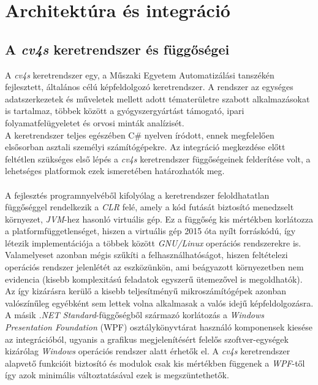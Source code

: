\chapter{Architektúra és integráció} \label{chapter:architektura}

\section{A \emph{cv4s} keretrendszer és függőségei} \label{fuggosegek}


A \emph{cv4s} keretrendszer egy, a Műszaki Egyetem Automatizálási tanszékén fejlesztett, általános célú képfeldolgozó keretrendszer. A rendszer az egységes adatszerkezetek és műveletek mellett adott tématerületre szabott alkalmazásokat is tartalmaz, többek között a gyógyszergyártást támogató, ipari folyamatfelügyeletet és orvosi minták analízisét. \\
A keretrendszer teljes egészében C\# nyelven íródott, ennek megfelelően elsősorban asztali személyi számítógépekre. Az integráció megkezdése előtt feltétlen szükséges első lépés a \emph{cv4s} keretrendszer függőségeinek felderítése volt, a lehetséges platformok ezek ismeretében határozhatók meg. \\
\\
A fejlesztés programnyelvéből kifolyólag a keretrendszer feloldhatatlan függőséggel rendelkezik a \textit{CLR} felé, amely a kód futását biztosító menedzselt környezet, \emph{JVM}-hez hasonló virtuális gép. Ez a függőség kis mértékben korlátozza a platformfüggetlenséget, hiszen a virtuális gép 2015 óta nyílt forráskódú, így létezik implementációja a többek között \emph{GNU/Linux} operációs rendszerekre is. Valamelyeset azonban mégis szűkíti a felhasználhatóságot, hiszen feltételezi operációs rendszer jelenlétét az eszközünkön, ami beágyazott környezetben nem evidencia (kisebb komplexitású feladatok egyszerű ütemezővel is megoldhatók). Az így kizárásra kerülő a kisebb teljesítményű mikroszámítógépek azonban valószínűleg egyébként sem lettek volna alkalmasak a valós idejű képfeldolgozásra. \\
A másik \emph{.NET Standard}-függőségből származó korlátozás a \textit{Windows Presentation Foundation} (WPF) osztálykönyvtárat használó komponensek kiesése az integrációból, ugyanis a grafikus megjelenítésért felelős szoftver-egységek kizárólag \textit{Windows} operációs rendszer alatt érhetők el. A \emph{cv4s} keretrendszer alapvető funkcióit biztosító  és  modulok csak kis mértékben függenek a \emph{WPF}-től így azok minimális változtatásával ezek is megszüntethetők.\\
